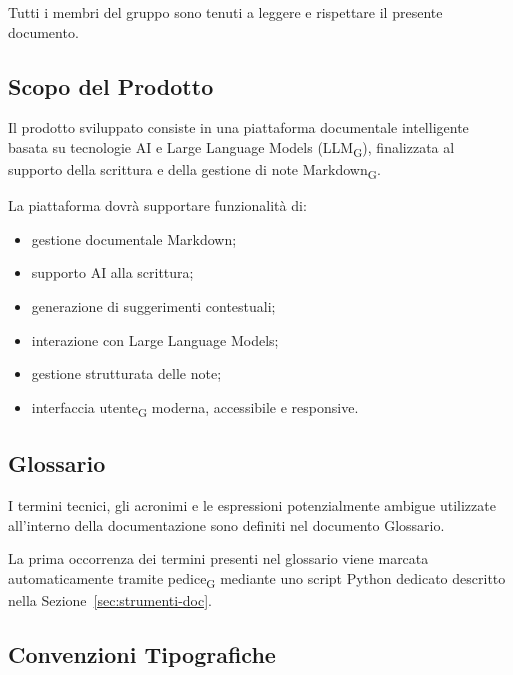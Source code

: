 Tutti i membri del gruppo sono tenuti a leggere e rispettare il presente documento.


\subsection{Scopo del Prodotto}

Il prodotto sviluppato consiste in una piattaforma documentale intelligente basata su tecnologie AI e Large Language Models (LLM\textsubscript{G}), finalizzata al supporto della scrittura e della gestione di note Markdown\textsubscript{G}.

La piattaforma dovrà supportare funzionalità di:
\begin{itemize}
    \item gestione documentale Markdown;
    \item supporto AI alla scrittura;
    \item generazione di suggerimenti contestuali;
    \item interazione con Large Language Models;
    \item gestione strutturata delle note;
    \item interfaccia utente\textsubscript{G} moderna, accessibile e responsive.
\end{itemize}


\subsection{Glossario}

I termini tecnici, gli acronimi e le espressioni potenzialmente ambigue utilizzate all'interno della documentazione sono definiti nel documento
{Glossario}.

La prima occorrenza dei termini presenti nel glossario viene marcata automaticamente tramite pedice\textsubscript{G} mediante uno script Python dedicato descritto nella Sezione~\ref{sec:strumenti-doc}.


\subsection{Convenzioni Tipografiche}

